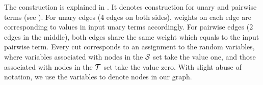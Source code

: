 The construction is explained in . It
denotes construction for unary and pairwise terms (see
\cite{Kolmogorov:PAMI04}). For unary edges (4 edges on both
sides), weights on each edge are corresponding to values in input
unary terms accordingly. For pairwise edges (2 edges in the
middle), both edges share the same weight which equals to the
input pairwise term. Every cut corresponds to an assignment to
the random variables, where variables associated with nodes in
the ${\cal S}$ set take the value one, and those associated with
nodes in the $\T$ set take the value zero. With slight abuse of
notation, we use the variables to denote nodes in our graph.




